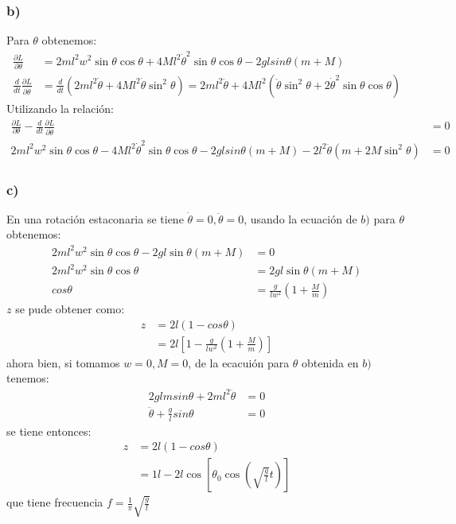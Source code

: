 \documentclass{article}
\begin{document}
\begin{tcolorbox}[breakable]
    \subsubsection*{b)}
    Para $\theta$ obtenemos:
    \begin{align*}    
        \frac{\partial L}{\partial \theta} 
        &=2ml^2w^2\sin\theta \cos\theta 
        + 4Ml^2\dot{\theta}^2\sin\theta \cos\theta 
        -2glsin\theta(m+M) \\
        \frac{d}{dt}\frac{\partial L}{\partial \dot{\theta}} 
        &= \frac{d}{dt}(2ml^2\dot{\theta} + 4Ml^2\dot{\theta}\sin^2\theta) 
        = 2ml^2\ddot{\theta} + 4Ml^2(\ddot{\theta}\sin^2\theta + 2\dot{\theta}^2\sin\theta \cos\theta)
    \end{align*}
    Utilizando la relación:
    \begin{align*}
        \frac{\partial L}{\partial \theta} - \frac{d}{dt}\frac{\partial L}{\partial \dot{\theta}} &= 0 \\
        2ml^2w^2\sin\theta \cos\theta 
        -4Ml^2\dot{\theta}^2\sin\theta \cos\theta 
        -2glsin\theta(m+M) 
        -2l^2\ddot{\theta}(m + 2M\sin^2\theta)  
        &= 0
    \end{align*}
    \subsubsection*{c)}
    En una rotación estaconaria se tiene $\dot{\theta} = 0, \ddot{\theta} = 0$, usando la ecuación de $b)$ para $\theta$ obtenemos:
    \begin{align*}
        2ml^2w^2\sin\theta \cos\theta 
        -2gl\sin\theta(m+M)   
        &= 0 \\
        2ml^2w^2\sin\theta \cos\theta
        &= 2gl\sin\theta(m+M) \\
        cos\theta &= \tfrac{g}{lw^2}(1+\tfrac{M}{m})
    \end{align*} 
    $z$ se pude obtener como:
    \begin{align*}
        z 
        &= 2l(1-cos\theta) \\
        &= 2l[1-\tfrac{g}{lw^2}(1+\tfrac{M}{m})]
    \end{align*}
    ahora bien, si tomamos $w=0,M=0$, de la ecacuión para $\theta$ obtenida en $b)$ tenemos:
    \begin{align*}
        2glmsin\theta 
        +2ml^2\ddot{\theta}  
        &= 0 \\
        \ddot{\theta} + \frac{g}{l}sin\theta &= 0
    \end{align*} 
    se tiene entonces:
    \begin{align*}
        z 
        &= 2l(1-cos\theta) \\ 
        &= 1l-2l\cos[\theta_0 \cos(\sqrt{\tfrac{g}{l}}t)]
    \end{align*}
    que tiene frecuencia $f = \frac{1}{\pi}\sqrt{\tfrac{g}{l}}$
\end{tcolorbox}
\end{document}
